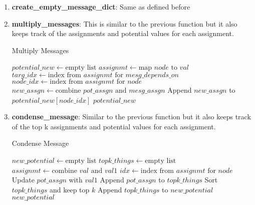 \documentclass[12pt]{article}
\begin{document}
\begin{enumerate}
    \item \textbf{create\_empty\_message\_dict}: Same as defined before
    \item \textbf{multiply\_messages}: This is similar to the previous function but it also keeps track of the assignments and potential values for each assignment.
    
    \begin{algorithm}
        \caption{Multiply Messages}
        \begin{algorithmic}[1]
            \State $potential\_new \gets \text{empty list}$
                \State $assignmt \gets \text{map } node \text{ to } val$
                \State $targ\_idx \gets \text{index from } assignmt \text{ for } mesg\_depends\_on$
                \State $node\_idx \gets \text{index from } assignmt \text{ for } node$
                            \State $new\_assgn \gets \text{combine } pot\_assgn \text{ and } mesg\_assgn$
                            \State Append $new\_assgn$ to $potential\_new[node\_idx]$
                        \EndIf
                    \EndFor
                \EndFor
            \EndFor
            \State \Return $potential\_new$
        \EndFunction
        \end{algorithmic}
    \end{algorithm}
    
    \item \textbf{condense\_message}: Similar to the previous function but it also keeps track of the top k assignments and potential values for each assignment.
    
    \begin{algorithm}
        \caption{Condense Message}
        \begin{algorithmic}[1]
            \State $new\_potential \gets \text{empty list}$
                \State $topk\_things \gets \text{empty list}$
                    \State $assignmt \gets \text{combine } val \text{ and } val1$
                    \State $idx \gets \text{index from } assignmt \text{ for } node$
                        \State Update $pot\_assgn$ with $val1$
                        \State Append $pot\_assgn$ to $topk\_things$
                    \EndFor
                \EndFor
                \State Sort $topk\_things$ and keep top $k$
                \State Append $topk\_things$ to $new\_potential$
            \EndFor
            \State \Return $new\_potential$
        \EndFunction
        \end{algorithmic}
    \end{algorithm}


\end{enumerate}
\end{document}
